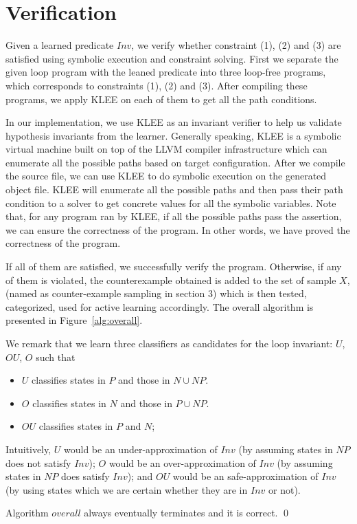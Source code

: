 
\section{Verification}
Given a learned predicate $Inv$, we verify whether constraint (1), (2) and (3) are satisfied using symbolic execution and constraint solving.
First we separate the given loop program with the leaned predicate into three loop-free programs,
which corresponds to constraints (1), (2) and (3). 
After compiling these programs, we apply KLEE on each of them to get all the path conditions.



In our implementation, we use KLEE\cite{cadar2008klee} as an invariant verifier to help us validate hypothesis invariants from the learner.
Generally speaking, KLEE is a symbolic virtual machine built on top of the LLVM compiler infrastructure
which can enumerate all the possible paths based on target configuration.
After we compile the source file, we can use KLEE to do symbolic execution on the generated object file.
KLEE will enumerate all the possible paths and then pass their path condition to a solver to get concrete values for all the symbolic variables.
Note that, for any program ran by KLEE, if all the possible paths pass the assertion, 
we can ensure the correctness of the program.
In other words, we have proved the correctness of the program.




If all of them are satisfied, we successfully verify the program. 
Otherwise, if any of them is violated, the counterexample obtained is added to the set of sample $X$, (named as counter-example sampling in section 3)
 which is then tested, categorized, used for active learning accordingly. 
 The overall algorithm is presented in Figure~\ref{alg:overall}.

We remark that we learn three classifiers as candidates for the loop invariant: $U$, $OU$, $O$ such that
\begin{itemize}
\item $U$ classifies states in $P$ and those in $N \cup NP$.
\item $O$ classifies states in $N$ and those in $P \cup NP$.
\item $OU$ classifies states in $P$ and $N$;
\end{itemize}
Intuitively, $U$ would be an under-approximation of $Inv$ (by assuming states in $NP$ does not satisfy $Inv$); 
$O$ would be an over-approximation of $Inv$ (by assuming states in $NP$ does satisfy $Inv$); 
and $OU$ would be an safe-approximation of $Inv$ (by using states which we are certain whether they are in $Inv$ or not).
\begin{example}
\end{example}


\begin{theorem}
Algorithm $overall$ always eventually terminates and it is correct. \hfill \qed
\end{theorem}
